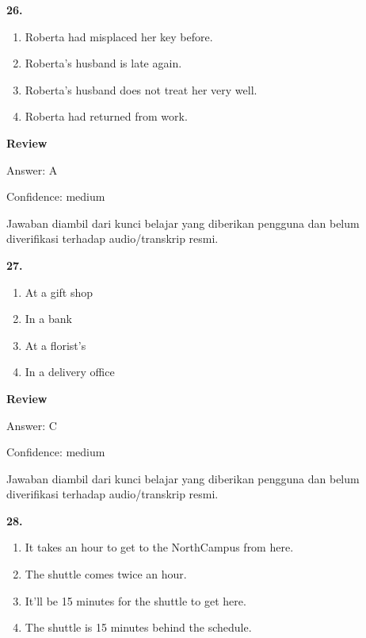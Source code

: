 \documentclass[12pt]{article}
\begin{document}
\noindent\textbf{26.}
\begin{enumerate}[label=(\Alph*),leftmargin=*,itemsep=0.2em]
\item Roberta had misplaced her key before.
\item Roberta's husband is late again.
\item Roberta's husband does not treat her very well.
\item Roberta had returned from work.
\end{enumerate}
\par
\begingroup
\setlength{\parskip}{0pt}
\setlength{\parindent}{0pt}
\textbf{Review}\par
Answer: A\par
Confidence: medium\par
Jawaban diambil dari kunci belajar yang diberikan pengguna dan belum diverifikasi terhadap audio/transkrip resmi.\par
\endgroup
\par
\vspace{0.25\baselineskip}
\noindent\textbf{27.}
\begin{enumerate}[label=(\Alph*),leftmargin=*,itemsep=0.2em]
\item At a gift shop
\item In a bank
\item At a florist's
\item In a delivery office
\end{enumerate}
\par
\begingroup
\setlength{\parskip}{0pt}
\setlength{\parindent}{0pt}
\textbf{Review}\par
Answer: C\par
Confidence: medium\par
Jawaban diambil dari kunci belajar yang diberikan pengguna dan belum diverifikasi terhadap audio/transkrip resmi.\par
\endgroup
\par
\vspace{0.25\baselineskip}
\noindent\textbf{28.}
\begin{enumerate}[label=(\Alph*),leftmargin=*,itemsep=0.2em]
\item It takes an hour to get to the NorthCampus from here.
\item The shuttle comes twice an hour.
\item It'll be 15 minutes for the shuttle to get here.
\item The shuttle is 15 minutes behind the schedule.
\end{enumerate}
\end{document}
